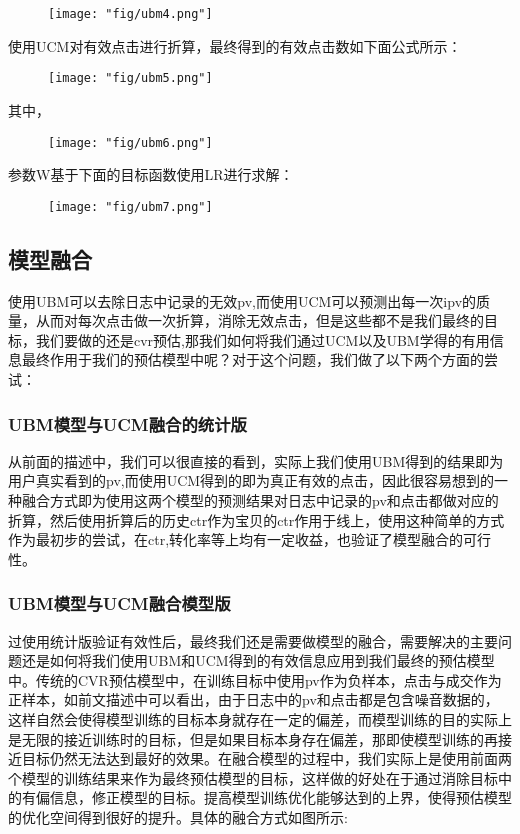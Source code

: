 \begin{figure}[!h]
	\centering
	\texttt{[image: "fig/ubm4.png"]}
	\caption{}
	\label{fig:ubm4}
\end{figure}

 使用UCM对有效点击进行折算，最终得到的有效点击数如下面公式所示：
\begin{figure}[!h]
	\centering
	\texttt{[image: "fig/ubm5.png"]}
	\caption{}
	\label{fig:ubm5}
\end{figure}
 其中，
\begin{figure}[!h]
	\centering
	\texttt{[image: "fig/ubm6.png"]}
	\caption{}
	\label{fig:ubm6}
\end{figure}
参数W基于下面的目标函数使用LR进行求解：
\begin{figure}[!h]
	\centering
	\texttt{[image: "fig/ubm7.png"]}
	\caption{}
	\label{fig:ubm7}
\end{figure}

\subsection{模型融合}
使用UBM可以去除日志中记录的无效pv,而使用UCM可以预测出每一次ipv的质量，从而对每次点击做一次折算，消除无效点击，但是这些都不是我们最终的目标，我们要做的还是cvr预估,那我们如何将我们通过UCM以及UBM学得的有用信息最终作用于我们的预估模型中呢？对于这个问题，我们做了以下两个方面的尝试：
\subsubsection{UBM模型与UCM融合的统计版}
       从前面的描述中，我们可以很直接的看到，实际上我们使用UBM得到的结果即为用户真实看到的pv,而使用UCM得到的即为真正有效的点击，因此很容易想到的一种融合方式即为使用这两个模型的预测结果对日志中记录的pv和点击都做对应的折算，然后使用折算后的历史ctr作为宝贝的ctr作用于线上，使用这种简单的方式作为最初步的尝试，在ctr,转化率等上均有一定收益，也验证了模型融合的可行性。
\subsubsection{UBM模型与UCM融合模型版}
	过使用统计版验证有效性后，最终我们还是需要做模型的融合，需要解决的主要问题还是如何将我们使用UBM和UCM得到的有效信息应用到我们最终的预估模型中。传统的CVR预估模型中，在训练目标中使用pv作为负样本，点击与成交作为正样本，如前文描述中可以看出，由于日志中的pv和点击都是包含噪音数据的，这样自然会使得模型训练的目标本身就存在一定的偏差，而模型训练的目的实际上是无限的接近训练时的目标，但是如果目标本身存在偏差，那即使模型训练的再接近目标仍然无法达到最好的效果。在融合模型的过程中，我们实际上是使用前面两个模型的训练结果来作为最终预估模型的目标，这样做的好处在于通过消除目标中的有偏信息，修正模型的目标。提高模型训练优化能够达到的上界，使得预估模型的优化空间得到很好的提升。具体的融合方式如图所示:

